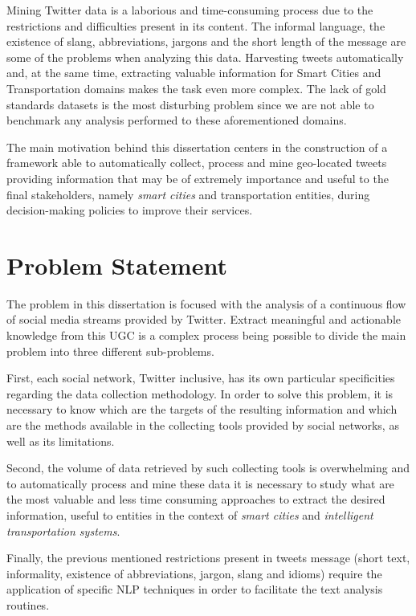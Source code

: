 Mining Twitter data is a laborious and time-consuming process due to the restrictions and difficulties present in its content. The informal language, the existence of slang, abbreviations, jargons and the short length of the message are some of the problems when analyzing this data. Harvesting tweets automatically and, at the same time, extracting valuable information for Smart Cities and Transportation domains makes the task even more complex. The lack of gold standards datasets is the most disturbing problem since we are not able to benchmark any analysis performed to these aforementioned domains.

The main motivation behind this dissertation centers in the construction of a framework able to automatically collect, process and mine geo-located tweets providing information that may be of extremely importance and useful to the final stakeholders, namely \textit{smart cities} and transportation entities, during decision-making policies to improve their services.

\section{Problem Statement}\label{sec:problem}
The problem in this dissertation is focused with the analysis of a continuous flow of social media streams provided by Twitter. Extract meaningful and actionable knowledge from this \gls{UGC} is a complex process being possible to divide the main problem into three different sub-problems.

First, each social network, Twitter inclusive, has its own particular specificities regarding the data collection methodology. In order to solve this problem, it is necessary to know which are the targets of the resulting information and which are the methods available in the collecting tools provided by social networks, as well as its limitations.

Second, the volume of data retrieved by such collecting tools is overwhelming and to automatically process and mine these data it is necessary to study what are the most valuable and less time consuming approaches to extract the desired information, useful to entities in the context of \textit{smart cities} and \textit{intelligent transportation systems}.

Finally, the previous mentioned restrictions present in tweets message (short text, informality, existence of abbreviations, jargon, slang and idioms) require the application of specific \gls{NLP} techniques in order to facilitate the text analysis routines.


